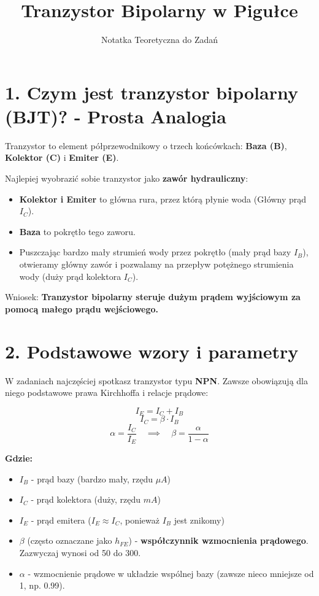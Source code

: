 \documentclass[11pt, a4paper]{article}
\title{\Huge \textbf{Tranzystor Bipolarny w Pigułce}}
\author{Notatka Teoretyczna do Zadań}
\date{}
\begin{document}
\maketitle

\section*{1. Czym jest tranzystor bipolarny (BJT)? - Prosta Analogia}
Tranzystor to element półprzewodnikowy o trzech końcówkach: \textbf{Baza (B)}, \textbf{Kolektor (C)} i \textbf{Emiter (E)}.

Najlepiej wyobrazić sobie tranzystor jako \textbf{zawór hydrauliczny}:
\begin{itemize}
    \item \textbf{Kolektor i Emiter} to główna rura, przez którą płynie woda (Główny prąd $I_C$).
    \item \textbf{Baza} to pokrętło tego zaworu.
    \item Puszczając bardzo mały strumień wody przez pokrętło (mały prąd bazy $I_B$), otwieramy główny zawór i pozwalamy na przepływ potężnego strumienia wody (duży prąd kolektora $I_C$).
\end{itemize}
Wniosek: \textbf{Tranzystor bipolarny steruje dużym prądem wyjściowym za pomocą małego prądu wejściowego.}

\section*{2. Podstawowe wzory i parametry}
W zadaniach najczęściej spotkasz tranzystor typu \textbf{NPN}. Zawsze obowiązują dla niego podstawowe prawa Kirchhoffa i relacje prądowe:

\begin{equation}
    I_E = I_C + I_B
\end{equation}
\begin{equation}
    I_C = \beta \cdot I_B
\end{equation}
\begin{equation}
    \alpha = \frac{I_C}{I_E} \quad \implies \quad \beta = \frac{\alpha}{1 - \alpha}
\end{equation}

\textbf{Gdzie:}
\begin{itemize}
    \item $I_B$ - prąd bazy (bardzo mały, rzędu $\mu A$)
    \item $I_C$ - prąd kolektora (duży, rzędu $mA$)
    \item $I_E$ - prąd emitera ($I_E \approx I_C$, ponieważ $I_B$ jest znikomy)
    \item $\beta$ (często oznaczane jako $h_{FE}$) - \textbf{współczynnik wzmocnienia prądowego}. Zazwyczaj wynosi od 50 do 300.
    \item $\alpha$ - wzmocnienie prądowe w układzie wspólnej bazy (zawsze nieco mniejsze od 1, np. 0.99).
\end{itemize}
\end{document}
